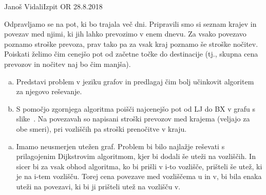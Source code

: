 \begin{naloga}{Janoš Vidali}{Izpit OR 28.8.2018}
\begin{vprasanje}
Odpravljamo se na pot, ki bo trajala več dni.
Pripravili smo si seznam krajev in povezav med njimi,
ki jih lahko prevozimo v enem dnevu.
Za vsako povezavo poznamo stroške prevoza,
prav tako pa za vsak kraj poznamo še stroške nočitev.
Poiskati želimo čim cenejšo pot od začetne točke do destinacije
(tj., skupna cena prevozov in nočitev naj bo čim manjša).

\begin{enumerate}[(a)]
\item Predstavi problem v jeziku grafov
in predlagaj čim bolj učinkovit algoritem za njegovo reševanje.

\item S pomočjo zgornjega algoritma poišči najcenejšo pot od LJ do BX
v grafu s slike~\fig[pocitnice].
Na povezavah so napisani stroški prevozov med krajema
(veljajo za obe smeri),
pri vozliščih pa stroški prenočitve v kraju.
\end{enumerate}
\end{vprasanje}




\begin{odgovor}
\begin{enumerate}[(a)]
\item Imamo neusmerjen utežen graf. Problem bi bilo najlažje reševati s prilagojenim Dijkstrovim algoritmom, kjer bi dodali še uteži na vozliščih. In sicer bi za vsak obhod algoritma, ko bi prišli v i-to vozlišče, prišteli še utež, ki je na i-tem vozlišču. Torej cena povezave med vozliščema u in v, bi bila enaka uteži na povezavi, ki bi ji prišteli utež na vozlišču v. 


\end{enumerate}
\end{odgovor}
\end{naloga}
